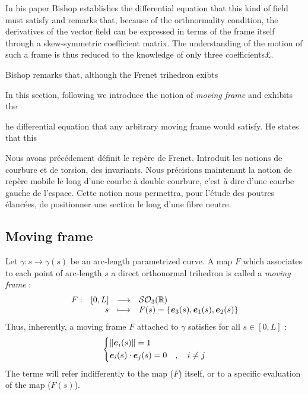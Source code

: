 In his paper Bishop establishes the differential equation that this kind of field must satisfy and remarks that, because of the orthnormality condition, the derivatives of the vector field can be expressed in terms of the frame itself through a skew-symmetric coefficient matrix. The understanding of the motion of such a frame is thus reduced to the knowledge of only three coefficients£.



Bishop remarks that, although the Frenet trihedron exibts

In this section, following \cite{Bishop1975} we introduce the notion of \emph{moving frame} and exhibits the 




he differential equation that any arbitrary moving frame would satisfy. He states that this 

Nous avons précédement définit le repère de Frenet. Introduit les notions de courbure et de torsion, des invariants.
Nous précisions maintenant la notion de repère mobile le long d'une courbe à double courbure, c'est à dire d'une courbe gauche de l'espace.
Cette notion nous permettra, pour l'étude des poutres élancées, de positionner une section le long d'une fibre neutre.


\subsection{Moving frame}

Let $\gamma : s \rightarrow \gamma(s)$ be an arc-length parametrized curve. A map $F$ which associates to each point of arc-length $s$ a direct orthonormal trihedron is called a \emph{moving frame} :
\begin{equation}
	\begin{array}{lrcl} F: & [0,L] & \longrightarrow & \mathcal{SO}_{3}(\mathbb{R}) \\ & s & \longmapsto & F(s) = \{\boldsymbol{e}_{3}(s),\boldsymbol{e}_{1}(s),\boldsymbol{e}_{2}(s)\} \end{array}
\end{equation}
Thus, inherently, a moving frame $F$ attached to $\gamma$ satisfies for all $s \in [0,L]$ :
\begin{equation}
	\left\{
	\begin{aligned}
		& \| \boldsymbol{e}_i(s) \| = 1 \\
		& \boldsymbol{e}_i(s) \cdot \boldsymbol{e}_j(s) = 0\quad , \quad i \neq j
	\end{aligned}
	\right.
\end{equation}
The terme  will refer indifferently to the map ($F$) itself, or to a specific evaluation of the map ($F(s)$).

